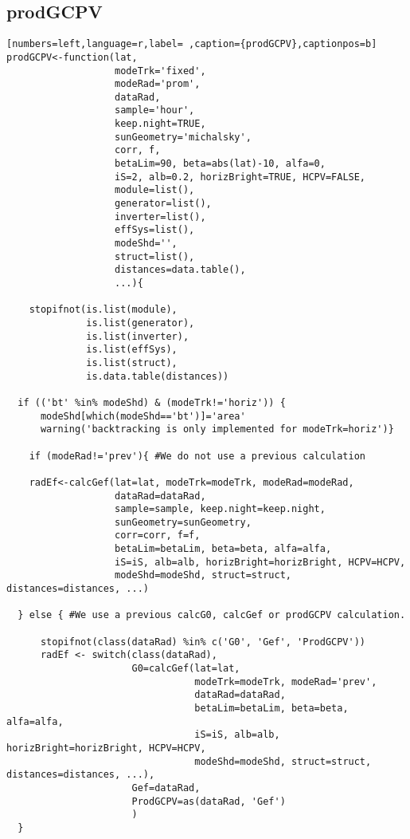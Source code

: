 \subsection{prodGCPV}
\label{sec:org5fb666b}
\begin{lstlisting}[numbers=left,language=r,label= ,caption={prodGCPV},captionpos=b]
prodGCPV<-function(lat,
                   modeTrk='fixed', 
                   modeRad='prom',
                   dataRad,
                   sample='hour',
                   keep.night=TRUE,
                   sunGeometry='michalsky',
                   corr, f,
                   betaLim=90, beta=abs(lat)-10, alfa=0,
                   iS=2, alb=0.2, horizBright=TRUE, HCPV=FALSE,
                   module=list(), 
                   generator=list(),
                   inverter=list(), 
                   effSys=list(), 
                   modeShd='',    
                   struct=list(), 
                   distances=data.table(),
                   ...){

    stopifnot(is.list(module),
              is.list(generator),
              is.list(inverter),
              is.list(effSys),
              is.list(struct),
              is.data.table(distances))

  if (('bt' %in% modeShd) & (modeTrk!='horiz')) {
      modeShd[which(modeShd=='bt')]='area'
      warning('backtracking is only implemented for modeTrk=horiz')}

    if (modeRad!='prev'){ #We do not use a previous calculation

    radEf<-calcGef(lat=lat, modeTrk=modeTrk, modeRad=modeRad,
                   dataRad=dataRad,
                   sample=sample, keep.night=keep.night,
                   sunGeometry=sunGeometry,
                   corr=corr, f=f,
                   betaLim=betaLim, beta=beta, alfa=alfa,
                   iS=iS, alb=alb, horizBright=horizBright, HCPV=HCPV,
                   modeShd=modeShd, struct=struct, distances=distances, ...)

  } else { #We use a previous calcG0, calcGef or prodGCPV calculation.

      stopifnot(class(dataRad) %in% c('G0', 'Gef', 'ProdGCPV'))
      radEf <- switch(class(dataRad),
                      G0=calcGef(lat=lat,
                                 modeTrk=modeTrk, modeRad='prev',
                                 dataRad=dataRad,
                                 betaLim=betaLim, beta=beta, alfa=alfa,
                                 iS=iS, alb=alb, horizBright=horizBright, HCPV=HCPV,
                                 modeShd=modeShd, struct=struct, distances=distances, ...),
                      Gef=dataRad,
                      ProdGCPV=as(dataRad, 'Gef')
                      )
  }



\end{lstlisting}
